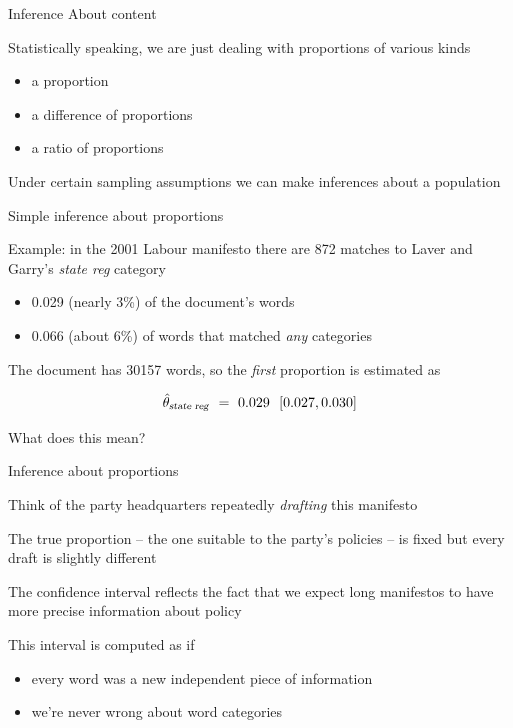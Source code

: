 \documentclass{hertieteaching}
\begin{document}
\begin{frame}{Inference About content}
\protect\hypertarget{inference-about-content}{}

Statistically speaking, we are just dealing with proportions of various
kinds

\begin{itemize}
\item
  a proportion\item
  a difference of proportions\item
  a ratio of proportions
\end{itemize}

Under certain sampling assumptions we can make inferences about a
population

\end{frame}

\begin{frame}{Simple inference about proportions}
\protect\hypertarget{simple-inference-about-proportions}{}

Example: in the 2001 Labour manifesto there are 872 matches to Laver and
Garry's \emph{state reg} category

\begin{itemize}
\item
  0.029 (nearly 3\%) of the document's words\item
  0.066 (about 6\%) of words that matched \emph{any} categories
\end{itemize}

The document has 30157 words, so the \emph{first} proportion is
estimated as

\[
\hat{\theta}_\text{\textsl{state reg}} ~=~ 0.029 ~~[0.027, 0.030]
\]

What does this mean?

\end{frame}

\begin{frame}{Inference about proportions}
\protect\hypertarget{inference-about-proportions}{}

Think of the party headquarters repeatedly \emph{drafting} this
manifesto

The true proportion -- the one suitable to the party's policies -- is
fixed but every draft is slightly different

The confidence interval reflects the fact that we expect long manifestos
to have more precise information about policy

\pause

This interval is computed as if

\begin{itemize}
\item
  every word was a new independent piece of information\item
  we're never wrong about word categories
\end{itemize}

\end{frame}
\end{document}
